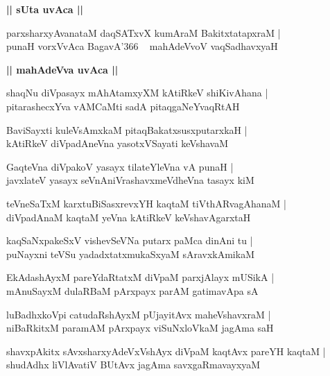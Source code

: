 \documentclass[twoside,12pt,openright]{book}
\newcounter{shloka}[chapter]
\def\uvaca#1{\centerline{{\large\textbf{#1}}}}
\begin{document}
\uvaca{|| sUta uvAca ||}

\begin{shloka}%
parxsharxyAvanataM daqSATxvX kumAraM BakitxtatapxraM |\\
punaH vorxVvAca BagavA\char'366 ~ mahAdeVvoV vaqSadhavxyaH 
\end{shloka}

\uvaca{|| mahAdeVva uvAca ||}

\begin{shloka}%
shaqNu diVpasayx mAhAtamxyXM kAtiRkeV shiKivAhana |\\
pitarashecxYva vAMCaMti sadA pitaqgaNeYvaqRtAH 
\end{shloka}

\begin{shloka}%
BaviSayxti kuleVsAmxkaM pitaqBakatxsusxputarxkaH |\\
kAtiRkeV  diVpadAneVna yasotxVSayati keVshavaM 
\end{shloka}

\begin{shloka}%
GaqteVna diVpakoV yasayx tilateYleVna vA punaH |\\
javxlateV yasayx seVnAniVrashavxmeVdheVna tasayx kiM 
\end{shloka}

\begin{shloka}%
teVneSaTxM karxtuBiSasxrevxYH kaqtaM tiVthARvagAhanaM |\\
diVpadAnaM kaqtaM yeVna kAtiRkeV keVshavAgarxtaH 
\end{shloka}

\begin{shloka}%
kaqSaNxpakeSxV vishevSeVNa putarx paMca dinAni tu |\\
puNayxni teVSu yadadxtatxmukaSxyaM sAravxkAmikaM 
\end{shloka}

\begin{shloka}%
EkAdashAyxM pareYdaRtatxM diVpaM parxjAlayx mUSikA |\\
mAnuSayxM dulaRBaM pArxpayx parAM gatimavApa sA 
\end{shloka}

\begin{shloka}%
luBadhxkoVpi catudaRshAyxM pUjayitAvx maheVshavxraM |\\
niBaRkitxM paramAM pArxpayx viSuNxloVkaM jagAma saH 
\end{shloka}

\begin{shloka}%
shavxpAkitx sAvxsharxyAdeVxVshAyx diVpaM kaqtAvx pareYH kaqtaM |\\
shudAdhx liVlAvatiV BUtAvx jagAma savxgaRmavayxyaM 
\end{shloka}
\end{document}

